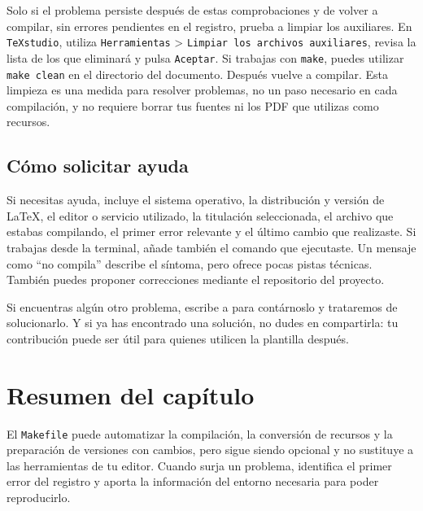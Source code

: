 Solo si el problema persiste después de estas comprobaciones y de volver a compilar, sin errores pendientes en el registro, prueba a limpiar los auxiliares. En \texttt{TeXstudio}, utiliza \texttt{Herramientas} > \texttt{Limpiar los archivos auxiliares}, revisa la lista de los que eliminará y pulsa \texttt{Aceptar}. Si trabajas con \texttt{make}, puedes utilizar \texttt{make clean} en el directorio del documento. Después vuelve a compilar. Esta limpieza es una medida para resolver problemas, no un paso necesario en cada compilación, y no requiere borrar tus fuentes ni los PDF que utilizas como recursos.

\subsection{Cómo solicitar ayuda}

Si necesitas ayuda, incluye el sistema operativo, la distribución y versión de \LaTeX{}, el editor o servicio utilizado, la titulación seleccionada, el archivo que estabas compilando, el primer error relevante y el último cambio que realizaste. Si trabajas desde la terminal, añade también el comando que ejecutaste. Un mensaje como ``no compila'' describe el síntoma, pero ofrece pocas pistas técnicas. También puedes proponer correcciones mediante el repositorio del proyecto.

Si encuentras algún otro problema, escribe a \contactauthor{} para contárnoslo y trataremos de solucionarlo. Y si ya has encontrado una solución, no dudes en compartirla: tu contribución puede ser útil para quienes utilicen la plantilla después.


\section{Resumen del capítulo}
\label{sec:resumen-compilacion-avanzada}

El \texttt{Makefile} puede automatizar la compilación, la conversión de recursos y la preparación de versiones con cambios, pero sigue siendo opcional y no sustituye a las herramientas de tu editor. Cuando surja un problema, identifica el primer error del registro y aporta la información del entorno necesaria para poder reproducirlo.

